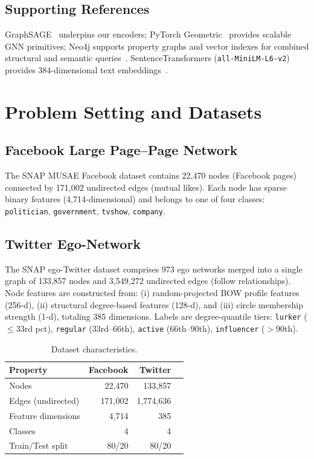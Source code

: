 \documentclass[conference]{IEEEtran}
\begin{document}
\subsection{Supporting References}
GraphSAGE~\cite{hamilton2017graphsage} underpins our encoders; PyTorch Geometric~\cite{pyg} provides scalable GNN primitives; Neo4j supports property graphs and vector indexes for combined structural and semantic queries~\cite{neo4j_vector}. SentenceTransformers (\texttt{all-MiniLM-L6-v2}) provides 384-dimensional text embeddings~\cite{sentence_bert}.

\section{Problem Setting and Datasets}

\subsection{Facebook Large Page--Page Network}
The SNAP MUSAE Facebook dataset contains 22{,}470 nodes (Facebook pages) connected by 171{,}002 undirected edges (mutual likes). Each node has sparse binary features (4{,}714-dimensional) and belongs to one of four classes: \texttt{politician}, \texttt{government}, \texttt{tvshow}, \texttt{company}.

\subsection{Twitter Ego-Network}
The SNAP ego-Twitter dataset comprises 973 ego networks merged into a single graph of 133{,}857 nodes and 3{,}549{,}272 undirected edges (follow relationships). Node features are constructed from: (i) random-projected BOW profile features (256-d), (ii) structural degree-based features (128-d), and (iii) circle membership strength (1-d), totaling 385 dimensions. Labels are degree-quantile tiers: \texttt{lurker} ($\leq$33rd pct), \texttt{regular} (33rd--66th), \texttt{active} (66th--90th), \texttt{influencer} ($>$90th).

\begin{table}[t]
\centering
\caption{Dataset characteristics.}
\label{tab:data}
\begin{tabular}{@{}l r r r@{}}
\toprule
Property & Facebook & Twitter \\
\midrule
Nodes & 22{,}470 & 133{,}857 \\
Edges (undirected) & 171{,}002 & 1{,}774{,}636 \\
Feature dimensions & 4{,}714 & 385 \\
Classes & 4 & 4 \\
Train/Test split & 80/20 & 80/20 \\
\bottomrule
\end{tabular}
\end{table}
\end{document}
